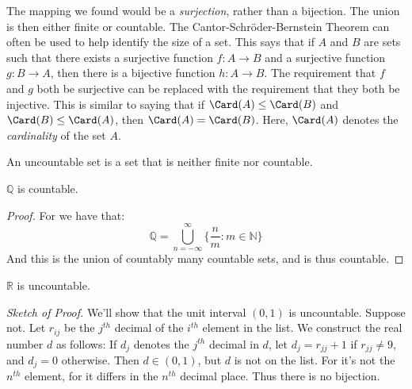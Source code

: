 \documentclass[crop=false,class=book,oneside]{standalone}
\begin{document}
            The mapping we found would be a
            \textit{surjection}, rather than a bijection.
            The union is then either finite or countable. The
            Cantor-Schr\"{o}der-Bernstein Theorem can often be
            used to help identify the size of a set. This says
            that if $A$ and $B$ are sets such that there exists
            a surjective function $f:A\rightarrow{B}$ and a
            surjective function $g:B\rightarrow{A}$, then there
            is a bijective function $h:A\rightarrow{B}$. The
            requirement that $f$ and $g$ both be surjective
            can be replaced with the requirement that they both
            be injective. This is similar to saying that if
            $\Card(A)\leq\Card(B)$ and $\Card(B)\leq\Card(A)$,
            then $\Card(A)=\Card(B)$. Here, $\Card(A)$ denotes
            the \textit{cardinality} of the set $A$.
            \begin{definition}
                An uncountable set is a set that is
                neither finite nor countable.
            \end{definition}
            \begin{theorem}
                $\mathbb{Q}$ is countable.
            \end{theorem}
            \begin{proof}
                For we have that:
                \begin{equation}
                    \mathbb{Q}=
                    \bigcup_{n=-\infty}^{\infty}
                    \Big\{\frac{n}{m}:m\in\mathbb{N}\Big\}
                \end{equation}
                And this is the union of countably
                many countable sets, and is thus countable.
            \end{proof}
            \begin{theorem}
                $\mathbb{R}$ is uncountable.
            \end{theorem}
            \textit{Sketch of Proof.} We'll show that the unit
            interval $(0,1)$ is uncountable. Suppose not.
            Let $r_{ij}$ be the $j^{th}$ decimal of the $i^{th}$
            element in the list. We construct the real number
            $d$ as follows: If $d_{j}$ denotes the $j^{th}$
            decimal in $d$, let $d_{j}=r_{jj}+1$ if
            $r_{jj}\ne{9}$, and $d_{j}=0$ otherwise. Then
            $d\in(0,1)$, but $d$ is not on the list. For it's not
            the $n^{th}$ element, for it differs in the
            $n^{th}$ decimal place. Thus there is no bijection.
\end{document}
